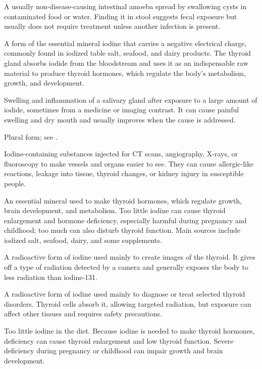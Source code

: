  A usually non-disease-causing intestinal amoeba spread by swallowing cysts in contaminated food or water. Finding it in stool suggests fecal exposure but usually does not require treatment unless another infection is present.

 A form of the essential mineral iodine that carries a negative electrical charge, commonly found in iodized table salt, seafood, and dairy products. The thyroid gland absorbs iodide from the bloodstream and uses it as an indispensable raw material to produce thyroid hormones, which regulate the body's metabolism, growth, and development.

 Swelling and inflammation of a salivary gland after exposure to a large amount of iodide, sometimes from a medicine or imaging contrast. It can cause painful swelling and dry mouth and usually improves when the cause is addressed.

 Plural form; see .

 Iodine-containing substances injected for CT scans, angiography, X-rays, or fluoroscopy to make vessels and organs easier to see. They can cause allergic-like reactions, leakage into tissue, thyroid changes, or kidney injury in susceptible people.

 An essential mineral used to make thyroid hormones, which regulate growth, brain development, and metabolism. Too little iodine can cause thyroid enlargement and hormone deficiency, especially harmful during pregnancy and childhood; too much can also disturb thyroid function. Main sources include iodized salt, seafood, dairy, and some supplements.

 A radioactive form of iodine used mainly to create images of the thyroid. It gives off a type of radiation detected by a camera and generally exposes the body to less radiation than iodine-131.

 A radioactive form of iodine used mainly to diagnose or treat selected thyroid disorders. Thyroid cells absorb it, allowing targeted radiation, but exposure can affect other tissues and requires safety precautions.

 Too little iodine in the diet. Because iodine is needed to make thyroid hormones, deficiency can cause thyroid enlargement and low thyroid function. Severe deficiency during pregnancy or childhood can impair growth and brain development.

